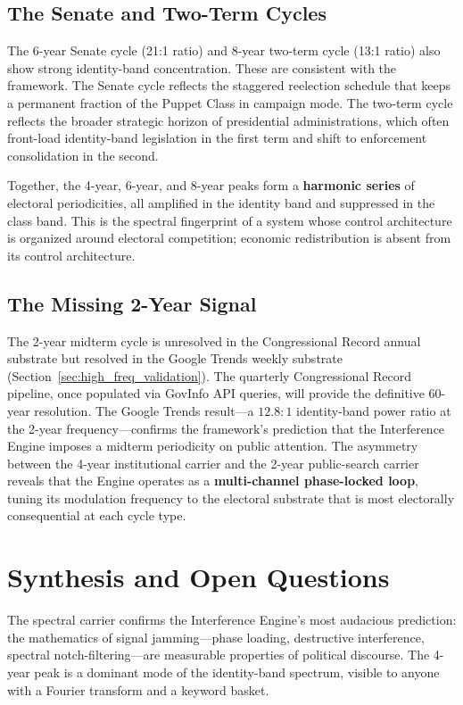 \subsection{The Senate and Two-Term Cycles}

The 6-year Senate cycle (21:1 ratio) and 8-year two-term cycle (13:1 ratio) also show strong identity-band concentration. These are consistent with the framework. The Senate cycle reflects the staggered reelection schedule that keeps a permanent fraction of the Puppet Class in campaign mode. The two-term cycle reflects the broader strategic horizon of presidential administrations, which often front-load identity-band legislation in the first term and shift to enforcement consolidation in the second.

Together, the 4-year, 6-year, and 8-year peaks form a \textbf{harmonic series} of electoral periodicities, all amplified in the identity band and suppressed in the class band. This is the spectral fingerprint of a system whose control architecture is organized around electoral competition; economic redistribution is absent from its control architecture.

\subsection{The Missing 2-Year Signal}

The 2-year midterm cycle is unresolved in the Congressional Record annual substrate but resolved in the Google Trends weekly substrate (Section~\ref{sec:high_freq_validation}). The quarterly Congressional Record pipeline, once populated via GovInfo API queries, will provide the definitive 60-year resolution. The Google Trends result---a $12.8:1$ identity-band power ratio at the 2-year frequency---confirms the framework's prediction that the Interference Engine imposes a midterm periodicity on public attention. The asymmetry between the 4-year institutional carrier and the 2-year public-search carrier reveals that the Engine operates as a \textbf{multi-channel phase-locked loop}, tuning its modulation frequency to the electoral substrate that is most electorally consequential at each cycle type.



\section{Synthesis and Open Questions}

The spectral carrier confirms the Interference Engine's most audacious prediction: the mathematics of signal jamming---phase loading, destructive interference, spectral notch-filtering---are measurable properties of political discourse. The 4-year peak is a dominant mode of the identity-band spectrum, visible to anyone with a Fourier transform and a keyword basket.

